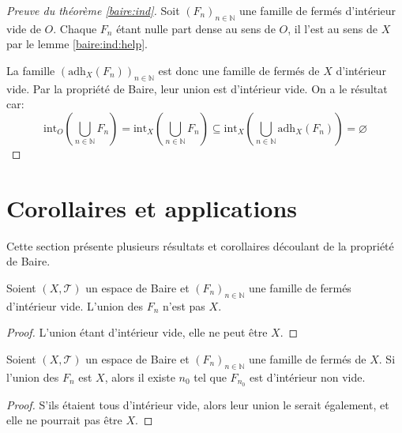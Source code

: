 \begin{proof}[Preuve du théorème \ref{baire:ind}]
  Soit $(F_n)_{n\in\mathbb N}$ une famille de fermés d'intérieur
  vide de $O$. Chaque $F_n$ étant nulle part dense au sens
  de $O$, il l'est au sens de $X$ par le lemme \ref{baire:ind:help}.

  La famille $(\mathrm{adh}_X(F_n))_{n\in\mathbb N}$ est donc une
  famille de fermés de $X$ d'intérieur vide. Par la propriété
  de Baire, leur union est d'intérieur vide. On a le résultat car:
  $$\mathrm{int}_O\left(\bigcup_{n\in\mathbb N}F_n\right) =
  \mathrm{int}_X\left(\bigcup_{n\in\mathbb N}F_n\right) \subseteq
  \mathrm{int}_X\left(\bigcup_{n\in\mathbb N}\mathrm{adh}_X(F_n)\right) =\varnothing$$


\end{proof}

\section{Corollaires et applications}
Cette section présente plusieurs résultats et corollaires
découlant de la propriété de Baire.

\begin{prop}
  Soient $(X, \mathcal{T})$ un espace de Baire et $(F_n)_{n\in\mathbb N}$
  une famille de fermés d'intérieur vide. L'union des $F_n$ n'est pas
  $X$.
\end{prop}
\begin{proof}
  L'union étant d'intérieur vide, elle ne peut être $X$.
\end{proof}

\begin{prop}\label{baire:cor:intf}
  Soient $(X, \mathcal{T})$ un espace de Baire et $(F_n)_{n\in\mathbb N}$
  une famille de fermés de $X$. Si l'union des $F_n$ est $X$,
  alors il existe $n_0$ tel que $F_{n_0}$ est d'intérieur non vide.
\end{prop}
\begin{proof}
  S'ils étaient tous d'intérieur vide, alors leur union le serait également,
  et elle ne pourrait pas être $X$.
\end{proof}

